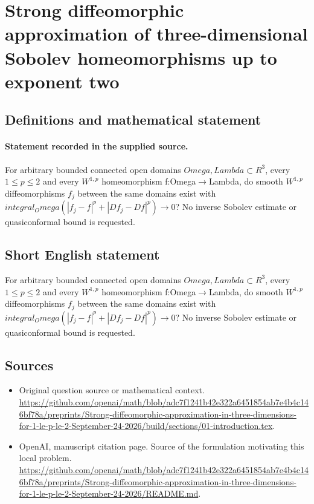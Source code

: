 \documentclass[11pt]{article}
\begin{document}
\section*{Strong diffeomorphic approximation of three-dimensional Sobolev homeomorphisms up to exponent two}\label{30007342}
\subsection{Definitions and mathematical statement}
\paragraph{Statement recorded in the supplied source.}
For arbitrary bounded connected open domains $Omega,Lambda\subset R^3$, every $1\leq p\leq 2$ and every $W^{1,p}$ homeomorphism f:Omega$\to$Lambda, do smooth $W^{1,p}$ diffeomorphisms $f_j$ between the same domains exist with $integral_Omega(|f_j-f|^p+|Df_j-Df|^p)\to 0$? No inverse Sobolev estimate or quasiconformal bound is requested.
\subsection{Short English statement}
For arbitrary bounded connected open domains $Omega,Lambda\subset R^3$, every $1\leq p\leq 2$ and every $W^{1,p}$ homeomorphism f:Omega$\to$Lambda, do smooth $W^{1,p}$ diffeomorphisms $f_j$ between the same domains exist with $integral_Omega(|f_j-f|^p+|Df_j-Df|^p)\to 0$? No inverse Sobolev estimate or quasiconformal bound is requested.
\subsection{Sources}
\begin{itemize}
\item[S1] Original question source or mathematical context.
\url{https://github.com/openai/math/blob/adc7f1241b42e322a6451854ab7e4b4c146bf78a/preprints/Strong-diffeomorphic-approximation-in-three-dimensions-for-1-le-p-le-2-September-24-2026/build/sections/01-introduction.tex}.
\item[S2] OpenAI, manuscript citation page. Source of the formulation motivating this local problem.
\url{https://github.com/openai/math/blob/adc7f1241b42e322a6451854ab7e4b4c146bf78a/preprints/Strong-diffeomorphic-approximation-in-three-dimensions-for-1-le-p-le-2-September-24-2026/README.md}.
\end{itemize}
\end{document}
